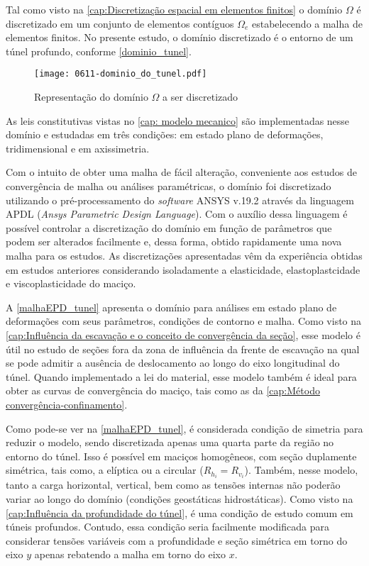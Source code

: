 Tal como visto na \autoref{cap:Discretização espacial em elementos finitos} o domínio $\Omega$ é discretizado em um conjunto de elementos contíguos $\Omega_e$ estabelecendo a malha de elementos finitos. No presente estudo, o domínio discretizado é o entorno de um túnel profundo, conforme \autoref{dominio_tunel}.
\begin{figure}[H]
	\begin{center}
		\texttt{[image: 0611-dominio\_do\_tunel.pdf]}
	\end{center}
	\caption{\label{dominio_tunel}Representação do domínio $\Omega$ a ser discretizado}
\end{figure}
As leis constitutivas vistas no \autoref{cap: modelo mecanico} são implementadas nesse domínio e estudadas em três condições: em estado plano de deformações, tridimensional e em axissimetria.

Com o intuito de obter uma malha de fácil alteração, conveniente aos estudos de convergência de malha ou análises paramétricas, o domínio foi discretizado utilizando o pré-processamento do \textit{software} ANSYS v.19.2 através da linguagem APDL (\textit{Ansys Parametric Design Language}). Com o auxílio dessa linguagem é possível controlar a discretização do domínio em função de parâmetros que podem ser alterados facilmente e, dessa forma, obtido rapidamente uma nova malha para os estudos. As discretizações apresentadas vêm da experiência obtidas em estudos anteriores \cite{Quevedo2017} considerando isoladamente a elasticidade, elastoplastcidade e viscoplasticidade do maciço.

A \autoref{malhaEPD_tunel} apresenta o domínio para análises em estado plano de deformações com seus parâmetros, condições de contorno e malha. Como visto na \autoref{cap:Influência da escavação e o conceito de convergência da seção}, esse modelo é útil no estudo de seções fora da zona de influência da frente de escavação na qual se pode admitir a ausência de deslocamento ao longo do eixo longitudinal do túnel. Quando implementado a lei do material, esse modelo também é ideal para obter as curvas de convergência do maciço, tais como as da \autoref{cap:Método convergência-confinamento}.

Como pode-se ver na \autoref{malhaEPD_tunel}, é considerada condição de simetria para reduzir o modelo, sendo discretizada apenas uma quarta parte da região no entorno do túnel. Isso é possível em maciços homogêneos, com seção duplamente simétrica, tais como, a elíptica ou a circular ($R_{h_i}=R_{v_i}$). Também, nesse modelo, tanto a carga horizontal, vertical, bem como as tensões internas não poderão variar ao longo do domínio (condições geostáticas hidrostáticas). Como visto na \autoref{cap:Influência da profundidade do túnel}, é uma condição de estudo comum em túneis profundos. Contudo, essa condição seria facilmente modificada para considerar tensões variáveis com a profundidade e seção simétrica em torno do eixo $y$ apenas rebatendo a malha em torno do eixo $x$.

